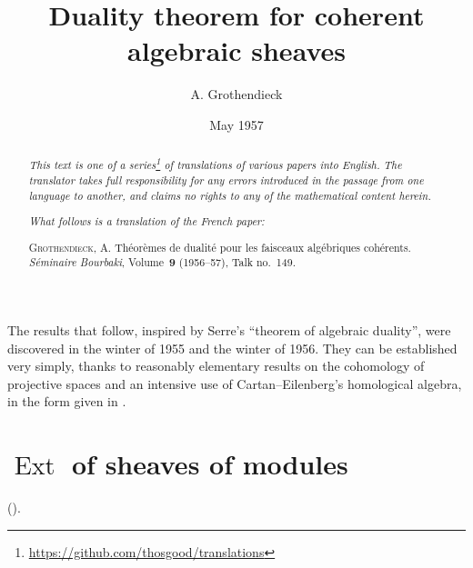 \documentclass{article}
\title{Duality theorem for coherent algebraic sheaves}
\author{A. Grothendieck}
\date{May 1957}
\theoremstyle{plain}
\DeclareMathOperator{\Ext}{Ext}
\newcommand{\oldpage}[1]{\marginpar{\footnotesize$\Big\vert$ \textit{p.~#1}}}
\begin{document}
\maketitle
\thispagestyle{fancy}

\renewcommand{\abstractname}{Translator's note.}

\begin{abstract}
  \renewcommand*{\thefootnote}{\fnsymbol{footnote}}
  \emph{This text is one of a series\footnote{\url{https://github.com/thosgood/translations}} of translations of various papers into English.}
  \emph{The translator takes full responsibility for any errors introduced in the passage from one language to another, and claims no rights to any of the mathematical content herein.}
  
  \emph{What follows is a translation of the French paper:}

  \medskip\noindent
  \textsc{Grothendieck, A.}
  Th\'{e}or\`{e}mes de dualit\'{e} pour les faisceaux alg\'{e}briques coh\'{e}rents.
  \emph{S\'{e}minaire Bourbaki}, Volume~\textbf{9} (1956--57), Talk no.~149.
\end{abstract}

\setcounter{footnote}{0}

\tableofcontents
\bigskip



\oldpage{149-01}
The results that follow, inspired by Serre's ``theorem of algebraic duality'', were discovered in the winter of 1955 and the winter of 1956.
They can be established very simply, thanks to reasonably elementary results on the cohomology of projective spaces \cite{3} and an intensive use of Cartan--Eilenberg's homological algebra, in the form given in \cite{2}.


\section{$\Ext$ of sheaves of modules}
\label{section1}

(\cite[chap.~3 and 4]{2}).
\end{document}
